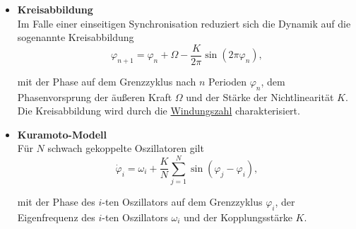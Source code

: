 \documentclass{article}
\begin{document}
	\begin{itemize}
		\item \textbf{Kreisabbildung}\\
		Im Falle einer einseitigen Synchronisation reduziert sich die Dynamik auf die sogenannte Kreisabbildung
			\begin{equation}
				\varphi_{n+1} = \varphi_n + \Omega - \frac{K}{2\pi} \sin(2 \pi \varphi_n),
			\end{equation}
		
		mit der Phase auf dem Grenzzyklus nach $n$ Perioden $\varphi_n$, dem Phasenvorsprung der äußeren Kraft $\Omega$ und der Stärke der Nichtlinearität $K$.\\
		Die Kreisabbildung wird durch die \underline{Windungszahl} charakterisiert.
		
		
		\item \textbf{Kuramoto-Modell}\\
		Für $N$ schwach gekoppelte Oszillatoren gilt
			\begin{equation}
				\dot{\varphi}_i = \omega_i + \frac{K}{N} \sum_{j=1}^N \sin(\varphi_j - \varphi_i),
			\end{equation}
		
		mit der Phase des $i$-ten Oszillators auf dem Grenzzyklus $\varphi_i$, der Eigenfrequenz des $i$-ten Oszillators $\omega_i$ und der Kopplungsstärke $K$.
	\end{itemize}


\newpage
\end{document}

